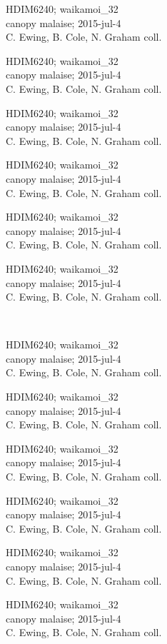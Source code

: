 \documentclass[2pt]{extarticle}
\begin{document}
\noindent
\parbox{0.16\textwidth}{\tiny \raggedright \rule[-0.3\baselineskip]{0pt}{10pt}HDIM6240; waikamoi\_32\\ canopy malaise; 2015-jul-4\\ C. Ewing, B. Cole, N. Graham coll.}
\parbox{0.16\textwidth}{\tiny \raggedright \rule[-0.3\baselineskip]{0pt}{10pt}HDIM6240; waikamoi\_32\\ canopy malaise; 2015-jul-4\\ C. Ewing, B. Cole, N. Graham coll.}
\parbox{0.16\textwidth}{\tiny \raggedright \rule[-0.3\baselineskip]{0pt}{10pt}HDIM6240; waikamoi\_32\\ canopy malaise; 2015-jul-4\\ C. Ewing, B. Cole, N. Graham coll.}
\parbox{0.16\textwidth}{\tiny \raggedright \rule[-0.3\baselineskip]{0pt}{10pt}HDIM6240; waikamoi\_32\\ canopy malaise; 2015-jul-4\\ C. Ewing, B. Cole, N. Graham coll.}
\parbox{0.16\textwidth}{\tiny \raggedright \rule[-0.3\baselineskip]{0pt}{10pt}HDIM6240; waikamoi\_32\\ canopy malaise; 2015-jul-4\\ C. Ewing, B. Cole, N. Graham coll.}
\parbox{0.16\textwidth}{\tiny \raggedright \rule[-0.3\baselineskip]{0pt}{10pt}HDIM6240; waikamoi\_32\\ canopy malaise; 2015-jul-4\\ C. Ewing, B. Cole, N. Graham coll.} \\ 
\vspace{0.001in} 

\noindent
\parbox{0.16\textwidth}{\tiny \raggedright \rule[-0.3\baselineskip]{0pt}{10pt}HDIM6240; waikamoi\_32\\ canopy malaise; 2015-jul-4\\ C. Ewing, B. Cole, N. Graham coll.}
\parbox{0.16\textwidth}{\tiny \raggedright \rule[-0.3\baselineskip]{0pt}{10pt}HDIM6240; waikamoi\_32\\ canopy malaise; 2015-jul-4\\ C. Ewing, B. Cole, N. Graham coll.}
\parbox{0.16\textwidth}{\tiny \raggedright \rule[-0.3\baselineskip]{0pt}{10pt}HDIM6240; waikamoi\_32\\ canopy malaise; 2015-jul-4\\ C. Ewing, B. Cole, N. Graham coll.}
\parbox{0.16\textwidth}{\tiny \raggedright \rule[-0.3\baselineskip]{0pt}{10pt}HDIM6240; waikamoi\_32\\ canopy malaise; 2015-jul-4\\ C. Ewing, B. Cole, N. Graham coll.}
\parbox{0.16\textwidth}{\tiny \raggedright \rule[-0.3\baselineskip]{0pt}{10pt}HDIM6240; waikamoi\_32\\ canopy malaise; 2015-jul-4\\ C. Ewing, B. Cole, N. Graham coll.}
\parbox{0.16\textwidth}{\tiny \raggedright \rule[-0.3\baselineskip]{0pt}{10pt}HDIM6240; waikamoi\_32\\ canopy malaise; 2015-jul-4\\ C. Ewing, B. Cole, N. Graham coll.} \\ 
\vspace{0.001in} 
\end{document}
